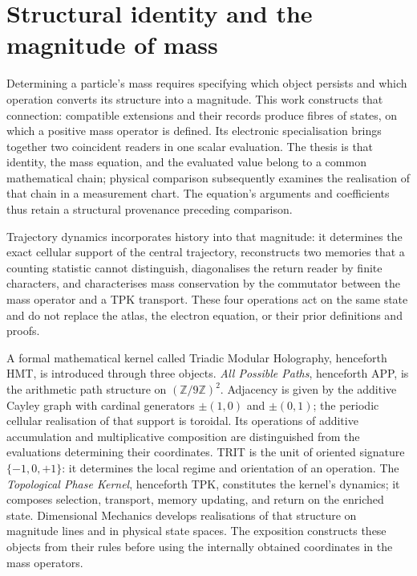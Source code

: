 \section{Structural identity and the magnitude of mass}
\label{vi:sec:introduccion}

Determining a particle's mass requires specifying which object persists
and which operation converts its structure into a magnitude. This work
constructs that connection: compatible extensions and their records
produce fibres of states, on which a positive mass operator is defined.
Its electronic specialisation brings together two coincident readers in
one scalar evaluation. The thesis is that identity, the mass equation,
and the evaluated value belong to a common mathematical chain; physical
comparison subsequently examines the realisation of that chain in a
measurement chart. The equation's arguments and coefficients thus retain
a structural provenance preceding comparison.

Trajectory dynamics incorporates history into that magnitude: it determines
the exact cellular support of the central trajectory, reconstructs two
memories that a counting statistic cannot distinguish, diagonalises the return
reader by finite characters, and characterises mass conservation by the
commutator between the mass operator and a TPK transport. These four operations
act on the same state and do not replace the atlas, the electron equation, or
their prior definitions and proofs.

A formal mathematical kernel called Triadic Modular Holography,
henceforth HMT, is introduced through three objects. \emph{All Possible
Paths}, henceforth APP, is the arithmetic path structure on
\((\mathbb Z/9\mathbb Z)^2\). Adjacency is given by the additive Cayley
graph with cardinal generators \(\pm(1,0)\) and \(\pm(0,1)\); the
periodic cellular realisation of that support is toroidal. Its
operations of additive accumulation and multiplicative composition are
distinguished from the evaluations determining their coordinates. TRIT
is the unit of oriented signature \(\{-1,0,+1\}\): it determines the
local regime and orientation of an operation. The \emph{Topological Phase
Kernel}, henceforth TPK, constitutes the kernel's dynamics; it composes
selection, transport, memory updating, and return on the enriched state.
Dimensional Mechanics develops realisations of that structure on
magnitude lines and in physical state spaces. The exposition constructs
these objects from their rules before using the internally obtained coordinates
in the mass operators.

